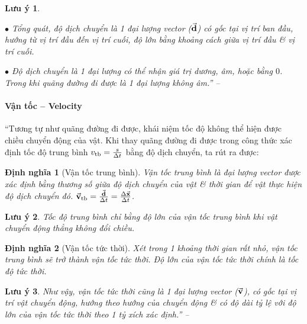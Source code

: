 \documentclass{article}
\numberwithin{equation}{section}
\newtheorem{dinhnghia}{Định nghĩa}[section]
\newtheorem{luuy}{Lưu ý}[section]
\begin{document}
\begin{luuy}
	\begin{enumerate*}
		\item[$\bullet$] Tổng quát, độ dịch chuyển là 1 đại lượng vector ($\vec{\bf d}$) có gốc tại vị trí ban đầu, hướng từ vị trí đầu đến vị trí cuối, độ lớn bằng khoảng cách giữa vị trí đầu \& vị trí cuối.
		\item[$\bullet$] Độ dịch chuyển là 1 đại lượng có thể nhận giá trị dương, âm, hoặc bằng $0$. Trong khi quãng đường đi được là 1 đại lượng không âm.'' -- \cite[pp. 26--27]{SGK_Vat_Ly_10_Chan_Troi_Sang_Tao}
	\end{enumerate*}
\end{luuy}

\paragraph{Vận tốc -- Velocity}
``Tương tự như quãng đường đi được, khái niệm tốc độ không thể hiện được chiều chuyển động của vật. Khi thay quãng đường đi được trong công thức xác định tốc độ trung bình $v_{\rm tb} = \frac{s}{\Delta t}$ bằng độ dịch chuyển, ta rút ra được:

\begin{dinhnghia}[Vận tốc trung bình]
	\emph{Vận tốc trung bình} là đại lượng vector được xác định bằng thương số giữa độ dịch chuyển của vật \& thời gian để vật thực hiện độ dịch chuyển đó. $\vec{\bf v}_{\rm tb} = \frac{\vec{\bf d}}{\Delta t} = \frac{\Delta\vec{\bf x}}{\Delta t}$.
\end{dinhnghia}

\begin{luuy}
	Tốc độ trung bình chỉ bằng độ lớn của vận tốc trung bình khi vật chuyển động thẳng không đổi chiều.
\end{luuy}

\begin{dinhnghia}[Vận tốc tức thời]
	Xét trong 1 khoảng thời gian rất nhỏ, vận tốc trung bình sẽ trở thành \emph{vận tốc tức thời}. Độ lớn của vận tốc tức thời chính là tốc độ tức thời.
\end{dinhnghia}

\begin{luuy}
	Như vậy, vận tốc tức thời cũng là 1 đại lượng vector ($\vec{\bf v}$), có gốc tại vị trí vật chuyển động, hướng theo hướng của chuyển động \& có độ dài tỷ lệ với độ lớn của vận tốc tức thời theo 1 tỷ xích xác định.'' -- \cite[pp. 27--28]{SGK_Vat_Ly_10_Chan_Troi_Sang_Tao}
\end{luuy}
\end{document}
